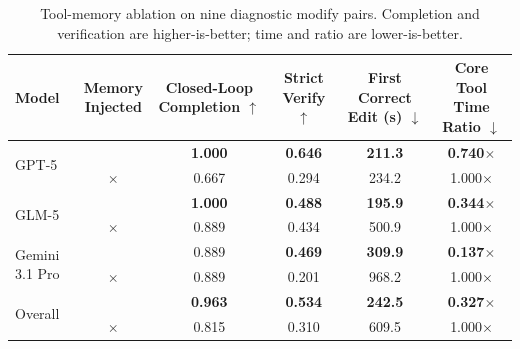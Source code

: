 \begin{table}[t]
\centering
\small
\setlength{\tabcolsep}{6pt}
\renewcommand{\arraystretch}{0.9}
\newcommand{\toolmemorymultiheader}[1]{\shortstack[c]{#1}}
\providecommand{\cmark}{\textcolor{green!50!black}{\checkmark}}
\providecommand{\xmark}{\textcolor{red!70!black}{\(\times\)}}
\newcommand{\toolmemoryyes}{\cmark}
\newcommand{\toolmemoryno}{\xmark}
\caption{Tool-memory ablation on nine diagnostic modify pairs. Completion and
verification are higher-is-better; time and ratio are lower-is-better.}
\label{tab:tool_memory_table1_redesign}
\begin{tabular*}{\textwidth}{@{\extracolsep{\fill}}lccccc@{}}
\toprule
Model & \toolmemorymultiheader{Memory\\Injected} &
\toolmemorymultiheader{Closed-Loop\\Completion $\uparrow$} &
\toolmemorymultiheader{Strict\\Verify $\uparrow$} &
\toolmemorymultiheader{First Correct\\Edit (s) $\downarrow$} &
\toolmemorymultiheader{Core Tool\\Time Ratio $\downarrow$} \\
\midrule
\multirow{2}{*}{GPT-5} & \toolmemoryyes{} & \textbf{1.000} & \textbf{0.646} & \textbf{211.3} & \textbf{0.740$\times$} \\
 & \toolmemoryno{} & 0.667 & 0.294 & 234.2 & 1.000$\times$ \\
\midrule
\multirow{2}{*}{GLM-5} & \toolmemoryyes{} & \textbf{1.000} & \textbf{0.488} & \textbf{195.9} & \textbf{0.344$\times$} \\
 & \toolmemoryno{} & 0.889 & 0.434 & 500.9 & 1.000$\times$ \\
\midrule
\multirow{2}{*}{Gemini 3.1 Pro} & \toolmemoryyes{} & 0.889 & \textbf{0.469} & \textbf{309.9} & \textbf{0.137$\times$} \\
 & \toolmemoryno{} & 0.889 & 0.201 & 968.2 & 1.000$\times$ \\
\midrule
\multirow{2}{*}{Overall} & \toolmemoryyes{} & \textbf{0.963} & \textbf{0.534} & \textbf{242.5} & \textbf{0.327$\times$} \\
 & \toolmemoryno{} & 0.815 & 0.310 & 609.5 & 1.000$\times$ \\
\bottomrule
\end{tabular*}
\end{table}

